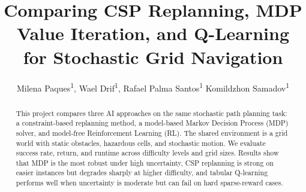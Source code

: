 \documentclass[letterpaper]{article} %
\title{Comparing CSP Replanning, MDP Value Iteration, and Q-Learning\\
for Stochastic Grid Navigation}
\author{
    Milena Paques\textsuperscript{\rm 1},
    Wael Drif\textsuperscript{\rm 1},
    Rafael Palma Santos\textsuperscript{\rm 1}
    Komildzhon Samadov\textsuperscript{\rm 1}
}
\begin{document}
\maketitle

\begin{abstract}
This project compares three AI approaches on the same stochastic path planning task: a constraint-based replanning method, a model-based Markov Decision Process (MDP) solver, and model-free Reinforcement Learning (RL). The shared environment is a grid world with static obstacles, hazardous cells, and stochastic motion. We evaluate success rate, return, and runtime across difficulty levels and grid sizes. Results show that MDP is the most robust under high uncertainty, CSP replanning is strong on easier instances but degrades sharply at higher difficulty, and tabular Q-learning performs well when uncertainty is moderate but can fail on hard sparse-reward cases.
\end{abstract}

\begin{links}
\end{links}
\end{document}
